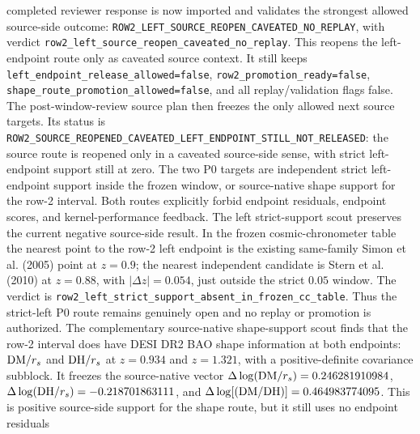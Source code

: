 \documentclass[11pt]{article}
\begin{document}
completed reviewer response is now imported and validates the strongest allowed
source-side outcome:
\texttt{ROW2\_\allowbreak{}LEFT\_\allowbreak{}SOURCE\_\allowbreak{}REOPEN\_\allowbreak{}CAVEATED\_\allowbreak{}NO\_\allowbreak{}REPLAY}, with verdict
\texttt{row2\_\allowbreak{}left\_\allowbreak{}source\_\allowbreak{}reopen\_\allowbreak{}caveated\_\allowbreak{}no\_\allowbreak{}replay}.  This reopens the
left-endpoint route only as caveated source context.  It still keeps
\texttt{left\_\allowbreak{}endpoint\_\allowbreak{}release\_\allowbreak{}allowed=\allowbreak{}false},
\texttt{row2\_\allowbreak{}promotion\_\allowbreak{}ready=\allowbreak{}false},
\texttt{shape\_\allowbreak{}route\_\allowbreak{}promotion\_\allowbreak{}allowed=\allowbreak{}false}, and all replay/validation
flags false.
The post-window-review source plan then freezes the only allowed next source
targets.  Its status is
\texttt{ROW2\_\allowbreak{}SOURCE\_\allowbreak{}REOPENED\_\allowbreak{}CAVEATED\_\allowbreak{}LEFT\_\allowbreak{}ENDPOINT\_\allowbreak{}STILL\_\allowbreak{}NOT\_\allowbreak{}RELEASED}:
the source route is reopened only in a caveated source-side sense, with strict
left-endpoint support still at zero.  The two P0 targets are independent strict
left-endpoint support inside the frozen window, or source-native shape support
for the row-2 interval.  Both routes explicitly forbid endpoint residuals,
endpoint scores, and kernel-performance feedback.
The left strict-support scout preserves the current negative source-side
result.  In the frozen cosmic-chronometer table the nearest point to the row-2
left endpoint is the existing same-family Simon et al. (2005) point at
\(z=0.9\); the nearest independent candidate is Stern et al. (2010) at
\(z=0.88\), with \(|\Delta z|=0.054\), just outside the strict \(0.05\)
window.  The verdict is
\texttt{row2\_\allowbreak{}left\_\allowbreak{}strict\_\allowbreak{}support\_\allowbreak{}absent\_\allowbreak{}in\_\allowbreak{}frozen\_\allowbreak{}cc\_\allowbreak{}table}.  Thus
the strict-left P0 route remains genuinely open and no replay or promotion is
authorized.
The complementary source-native shape-support scout finds that the row-2
interval does have DESI DR2 BAO shape information at both endpoints:
\({\rm DM}/r_s\) and \({\rm DH}/r_s\) at \(z=0.934\) and \(z=1.321\), with a
positive-definite covariance subblock.  It freezes the source-native vector
\(\Delta\log({\rm DM}/r_s)=0.246281910984\),
\(\Delta\log({\rm DH}/r_s)=-0.218701863111\), and
\(\Delta\log[({\rm DM}/{\rm DH})]=0.464983774095\).  This is positive
source-side support for the shape route, but it still uses no endpoint residuals
\end{document}
